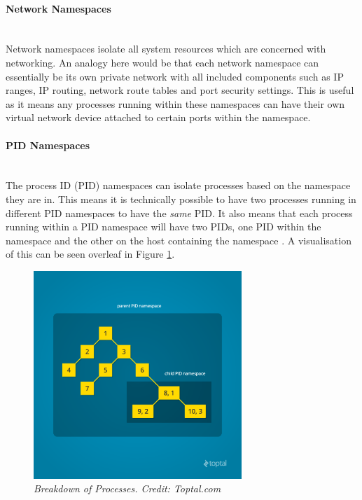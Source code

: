 \documentclass{article}
\begin{document}
\paragraph{Network Namespaces}\mbox{}\\
Network namespaces isolate all system resources which are concerned with networking. An analogy here would be that each network namespace can essentially be its own private network with all included components such as IP ranges, IP routing, network route tables and port security settings. This is useful as it means any processes running within these namespaces can have their own virtual network device attached to certain ports within the namespace.

\paragraph{PID Namespaces}\mbox{}\\
The process ID (PID) namespaces can isolate processes based on the namespace they are in. This means it is technically possible to have two processes running in different PID namespaces to have the \textit{same} PID. It also means that each process running within a PID namespace will have two PIDs, one PID within the namespace and the other on the host containing the namespace \citep{Kerrisk2013}. A visualisation of this can be seen overleaf in Figure \ref{fig:pid}.

\begin{figure}[!h]
\centering
\includegraphics*[width=0.7\textwidth]{components/images/pid}
\caption{\em Breakdown of Processes. Credit: Toptal.com}
\label{fig:pid}
\end{figure}
\end{document}
